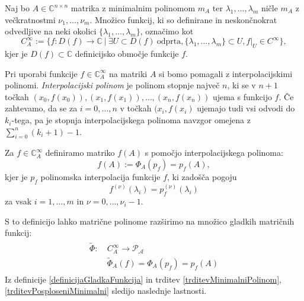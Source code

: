 \documentclass[mat1]{fmfdelo}
\newcommand{\C}{\mathbb C}
\begin{document}
Naj bo $A \in \C^{n\times n}$ matrika z minimalnim polinomom $m_A$ ter $\lambda_1, \ldots, \lambda_m$ ničle $m_A$ z večkratnostmi $\nu_1, \ldots, \nu_m$. Množico funkcij, ki so definirane in neskončnokrat odvedljive na neki okolici $\{\lambda_1, \ldots, \lambda_m\}$, označimo kot
\begin{equation*}
    C_A^\infty := \{ f: D(f) \rightarrow \C\ |\ \exists U \subset D(f)\ \text{odprta}, \{\lambda_1, \ldots, \lambda_m\} \subset U, f|_U \in C^\infty \},
\end{equation*}
kjer je $D(f) \subset \C$ definicijsko območje funkcije $f$.

Pri uporabi funkcije $f \in \C_A^\infty$ na matriki $A$ si bomo pomagali z interpolacijskimi polinomi. \emph{Interpolacijski polinom} je polinom stopnje največ $n$, ki se v $n+1$ točkah $(x_0, f(x_0)), (x_1, f(x_1)), \ldots, (x_n, f(x_n))$ ujema s funkcijo $f$. Če zahtevamo, da se za $i=0, \ldots, n$ v točkah $(x_i, f(x_i)$ ujemajo tudi vsi odvodi do $k_i$-tega, pa je stopnja interpolacijskega polinoma navzgor omejena z $\sum_{i=0}^n (k_i + 1) - 1$.
\begin{definicija} \label{definicijaGladkaFunkcija}
    Za $f \in \C_A^\infty$ definiramo matriko $f(A)$ s pomočjo interpolacijskega polinoma:
    \begin{equation*}
        f(A) := \Phi_A(p_f) = p_f(A),
    \end{equation*}
    kjer je $p_f$ polinomska interpolacija funkcije $f$, ki zadošča pogoju
    \begin{equation*}
        f^{(\nu)}(\lambda_i) = p_f^{(\nu)}(\lambda_i)
    \end{equation*}
    za vsak $i = 1, \ldots, m$ in $\nu = 0, \ldots, \nu_i-1$.
\end{definicija}
S to definicijo lahko matrične polinome razširimo na množico gladkih matričnih funkcij:
\begin{align}
    \begin{split}
        \widetilde{\Phi} :\ &C_A^\infty \longrightarrow \mathcal{P_A} \\
        &\widetilde{\Phi}_A(f) = \Phi_A(p_f) = p_f(A)
    \end{split}
\end{align}
Iz definicije \ref{definicijaGladkaFunkcija} in trditev \ref{trditevMinimalniPolinom}, \ref{trditevPosploseniMinimalni} sledijo naslednje lastnosti.
\end{document}

